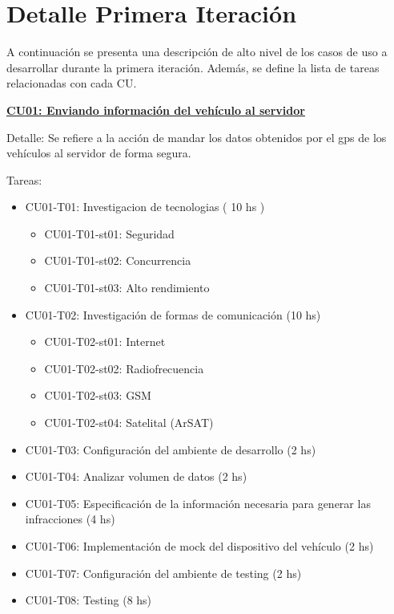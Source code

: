 \section{Detalle Primera Iteración}

A continuación se presenta una descripción de alto nivel de los casos de uso a 
desarrollar durante la primera iteración. Además, se define la lista de tareas 
relacionadas con cada CU.

\textbf{\underline{CU01: Enviando información del vehículo al servidor}}\newline


Detalle: Se refiere a la acción de mandar los datos obtenidos por el gps de los 
vehículos al servidor de forma segura.




Tareas: 
\begin{itemize}

\item CU01-T01: Investigacion de tecnologias ( 10 hs )
\begin{itemize}
\item CU01-T01-st01: Seguridad
\item CU01-T01-st02: Concurrencia
\item CU01-T01-st03: Alto rendimiento
\end{itemize}

\item CU01-T02: Investigación de formas de comunicación (10 hs)
\begin{itemize}
\item CU01-T02-st01: Internet
\item CU01-T02-st02: Radiofrecuencia
\item CU01-T02-st03: GSM
\item CU01-T02-st04: Satelital (ArSAT)
\end{itemize}

\item CU01-T03: Configuración del ambiente de desarrollo (2 hs)
\item CU01-T04: Analizar volumen de datos (2 hs)
\item CU01-T05: Especificación de la información necesaria para generar las infracciones (4 hs)
\item CU01-T06: Implementación de mock del dispositivo del vehículo (2 hs)
\item CU01-T07: Configuración del ambiente de testing (2 hs)
\item CU01-T08: Testing (8 hs)

\end{itemize}

